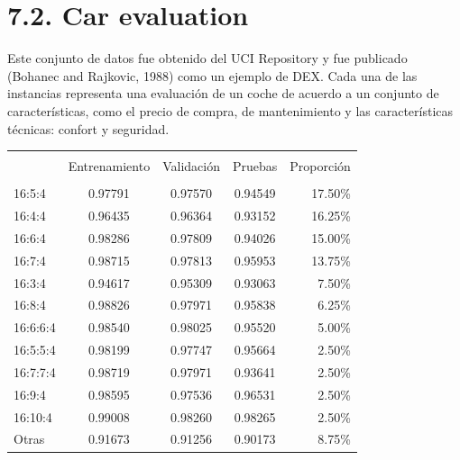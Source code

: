 \documentclass[spanish,a4paper,12pt,twoside]{report}
\begin{document}
  \section*{\Large 7.2. Car evaluation}
  Este conjunto de datos fue obtenido del UCI Repository y fue publicado (Bohanec and Rajkovic, 1988) como un ejemplo de DEX. Cada una de las instancias representa una evaluación de un coche de acuerdo a un conjunto de características, como el precio de compra, de mantenimiento y las características técnicas: confort y seguridad. \par
\begin{center}
   \label{table}
  \begin{tabular}{l c c c r}
    \hline \\ [-2ex]
    & Entrenamiento & Validación & Pruebas & Proporción \\ [0.5ex]
    \hline \\ [-1ex]
    16:5:4 & 0.97791 & 0.97570 & 0.94549 & 17.50\% \\ 
    16:4:4 & 0.96435 & 0.96364 & 0.93152 & 16.25\% \\
    16:6:4 & 0.98286 & 0.97809 & 0.94026 & 15.00\% \\
    16:7:4 & 0.98715 & 0.97813 & 0.95953 & 13.75\% \\
    16:3:4 & 0.94617 & 0.95309 & 0.93063 & 7.50\% \\
    16:8:4 & 0.98826 & 0.97971 & 0.95838 & 6.25\% \\
    16:6:6:4 & 0.98540 & 0.98025 & 0.95520 & 5.00\% \\
    16:5:5:4 & 0.98199 & 0.97747 & 0.95664 & 2.50\% \\
    16:7:7:4 & 0.98719 & 0.97971 & 0.93641 & 2.50\% \\
    16:9:4 & 0.98595 & 0.97536 & 0.96531 & 2.50\% \\
    16:10:4 & 0.99008 & 0.98260 & 0.98265 & 2.50\% \\
    Otras & 0.91673 & 0.91256 & 0.90173 & 8.75\% \\[1ex]
    \hline
  \end{tabular}
\end{center} \par
\end{document}
